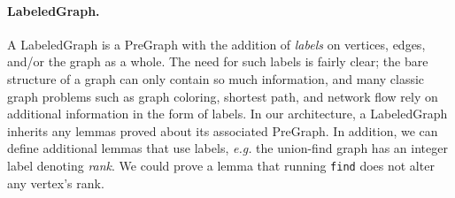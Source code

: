 \paragraph{LabeledGraph.}
A LabeledGraph is a PreGraph with the addition of \emph{labels} on 
vertices, edges, and/or the graph as a whole. The need for such labels
is fairly clear; the bare structure of a graph can only 
contain so much information, and many classic graph problems 
such as graph coloring, shortest path, and network flow rely on 
additional information in the form of labels. In our architecture, a
LabeledGraph inherits any lemmas proved about its associated PreGraph. 
In addition, we can define additional lemmas that use labels, 
\emph{e.g.} the union-find graph has an integer label denoting \emph{rank}.
We could prove a lemma that running \texttt{find} does not alter
any vertex's rank. 
\fi

\iffalse
\paragraph{LabeledGraph.}
A LabeledGraph is a PreGraph with labels, e.g. the ``mark bit'' used in Figure~\ref{fig:markgraph} are labels.
\fi
\iffalse
\paragraph{LabeledGraph.}
Although many basic lemmas can be proved about PreGraphs, they are inadequate for real program verification.
When reasoning about the concrete graphs manipulated by various algorithms,
we usually need to add a notion of \emph{labels} on vertices and/or edges, such as
the ``mark bit'' used in Figure~\ref{fig:markgraph}, letting us define notions like ``the vertices reachable via an unmarked path''
on LabeledGraphs.
\fi

\vspace{-0.75ex}
